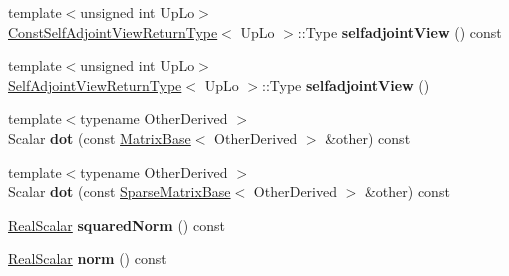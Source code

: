 \begin{DoxyCompactItemize}
\item 
\mbox{\label{class_eigen_1_1_sparse_matrix_base_abf640378dca3e71c173630ee17a0f90e}} 
{\footnotesize template$<$unsigned int Up\+Lo$>$ }\\\mbox{\hyperlink{struct_eigen_1_1_sparse_matrix_base_1_1_const_self_adjoint_view_return_type}{Const\+Self\+Adjoint\+View\+Return\+Type}}$<$ Up\+Lo $>$\+::Type {\bfseries selfadjoint\+View} () const
\item 
\mbox{\label{class_eigen_1_1_sparse_matrix_base_aa1e5343090bde6752c0bb695c94f9595}} 
{\footnotesize template$<$unsigned int Up\+Lo$>$ }\\\mbox{\hyperlink{struct_eigen_1_1_sparse_matrix_base_1_1_self_adjoint_view_return_type}{Self\+Adjoint\+View\+Return\+Type}}$<$ Up\+Lo $>$\+::Type {\bfseries selfadjoint\+View} ()
\item 
\mbox{\label{class_eigen_1_1_sparse_matrix_base_a4a2636ada34d7d8634de202d6669677a}} 
{\footnotesize template$<$typename Other\+Derived $>$ }\\Scalar {\bfseries dot} (const \mbox{\hyperlink{class_eigen_1_1_matrix_base}{Matrix\+Base}}$<$ Other\+Derived $>$ \&other) const
\item 
\mbox{\label{class_eigen_1_1_sparse_matrix_base_a237d4ca74a4de2558b0c64359fb9c481}} 
{\footnotesize template$<$typename Other\+Derived $>$ }\\Scalar {\bfseries dot} (const \mbox{\hyperlink{class_eigen_1_1_sparse_matrix_base}{Sparse\+Matrix\+Base}}$<$ Other\+Derived $>$ \&other) const
\item 
\mbox{\label{class_eigen_1_1_sparse_matrix_base_a5c8cfa22502f9b4ab1074436f1ffe541}} 
\mbox{\hyperlink{class_eigen_1_1_sparse_matrix_base_aaec8ace6efb785c81d442931c3248d88}{Real\+Scalar}} {\bfseries squared\+Norm} () const
\item 
\mbox{\label{class_eigen_1_1_sparse_matrix_base_aae1704e691a2bed034dea859db0c79af}} 
\mbox{\hyperlink{class_eigen_1_1_sparse_matrix_base_aaec8ace6efb785c81d442931c3248d88}{Real\+Scalar}} {\bfseries norm} () const
\item 

\end{DoxyCompactItemize}
